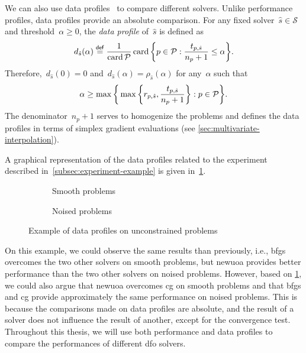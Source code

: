 We can also use data profiles~\cite{More_Wild_2009} to compare different solvers.
Unlike performance profiles, data profiles provide an absolute comparison.
For any fixed solver~$\hat{s} \in \mathcal{S}$ and threshold~$\alpha \ge 0$, the \emph{data profile} of~$\hat{s}$ is defined as
\begin{equation*}
    d_{\hat{s}}(\alpha) \eqdef \frac{1}{\card \mathcal{P}} \card \set[\bigg]{p \in \mathcal{P} : \frac{t_{p, \hat{s}}}{n_p + 1} \le \alpha}.
\end{equation*}
Therefore,~$d_{\hat{s}}(0) = 0$ and~$d_{\hat{s}}(\alpha) = \rho_{\hat{s}}(\alpha)$ for any~$\alpha$ such that
\begin{equation*}
    \alpha \ge \max \set[\bigg]{\max \set[\bigg]{r_{p, \hat{s}}, \frac{t_{p, \hat{s}}}{n_p + 1}} : p \in \mathcal{P}}.
\end{equation*}
The denominator~$n_p + 1$ serves to homogenize the problems and defines the data profiles in terms of simplex gradient evaluations (see \cref{sec:multivariate-interpolation}).

A graphical representation of the data profiles related to the experiment described in~\cref{subsec:experiment-example} is given in~\cref{fig:data-profile-example}.

\begin{figure}[ht]
    \centering
    \begin{subfigure}[b]{0.46\textwidth}
        \centering
        \caption{Smooth problems}
    \end{subfigure}
    \hfill
    \begin{subfigure}[b]{0.46\textwidth}
        \centering
        \caption{Noised problems}
    \end{subfigure}
    \caption{Example of data profiles on unconstrained problems}
    \label{fig:data-profile-example}
\end{figure}

On this example, we could observe the same results than previously, i.e., \gls{bfgs} overcomes the two other solvers on smooth problems, but \gls{newuoa} provides better performance than the two other solvers on noised problems.
However, based on \cref{fig:data-profile-example}, we could also argue that \gls{newuoa} overcomes \gls{cg} on smooth problems and that \gls{bfgs} and \gls{cg} provide approximately the same performance on noised problems.
This is because the comparisons made on data profiles are absolute, and the result of a solver does not influence the result of another, except for the convergence test.
Throughout this thesis, we will use both performance and data profiles to compare the performances of different \gls{dfo} solvers.
